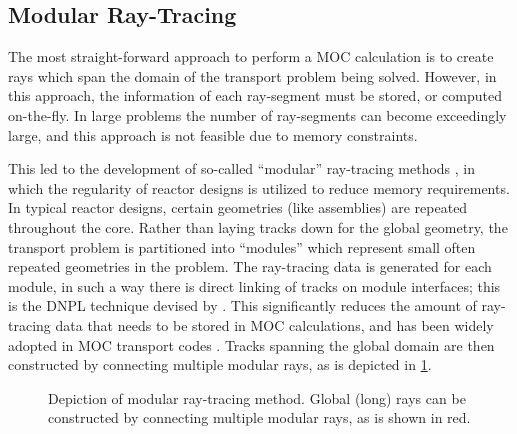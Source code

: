 {{      \subsection{Modular Ray-Tracing}{\label{ssec:RT:Modular Ray-Tracing}
        The most straight-forward approach to perform a \ac{MOC} calculation is to create rays which span the domain of the transport problem being solved.
        However, in this approach, the information of each ray-segment must be stored, or computed on-the-fly.
        In large problems the number of ray-segments can become exceedingly large, and this approach is not feasible due to memory constraints.

        This led to the development of so-called ``modular'' ray-tracing methods \cite{Filippone1980,Saji2000,Wu2003,Kochunas2013}, in which the regularity of reactor designs is utilized to reduce memory requirements.
        In typical reactor designs, certain geometries (like assemblies) are repeated throughout the core.
        Rather than laying tracks down for the global geometry, the transport problem is partitioned into ``modules'' which represent small often repeated geometries in the problem.
        The ray-tracing data is generated for each module, in such a way there is direct linking of tracks on module interfaces; this is the \ac{DNPL} technique devised by \citet{Saji2000}.
        This significantly reduces the amount of ray-tracing data that needs to be stored in \ac{MOC} calculations, and has been widely adopted in \ac{MOC} transport codes \cite{Hong1998,Jung2009,Tang2009,DeCART,APOLLO3,MPACT2016,Hebert2017a}.
        Tracks spanning the global domain are then constructed by connecting multiple modular rays, as is depicted in \cref{fig:MRT:Modular Ray Tracing}.

        \begin{figure}[h]
            \centering
            \def\svgwidth{0.4\linewidth}
            
            \caption{Depiction of modular ray-tracing method. Global (long) rays can be constructed by connecting multiple modular rays, as is shown in red.}
            \label{fig:MRT:Modular Ray Tracing}
        \end{figure}

}}}
